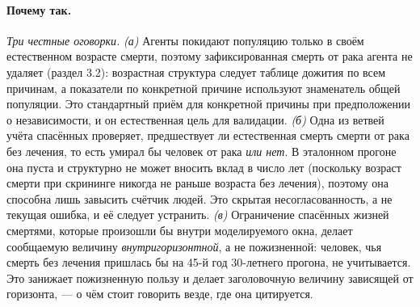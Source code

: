 \documentclass[12pt,a4paper]{article}
\newcommand{\why}[1]{\paragraph{Почему так.} #1}
\begin{document}
\why{\emph{Три честные оговорки.}
\emph{(а)} Агенты покидают популяцию только в своём естественном возрасте смерти, поэтому зафиксированная
смерть от рака агента не удаляет (раздел 3.2): возрастная структура следует таблице дожития по всем причинам,
а показатели по конкретной причине используют знаменатель общей популяции. Это стандартный приём для
конкретной причины при предположении о независимости, и он естественная цель для валидации.
\emph{(б)} Одна из ветвей учёта спасённых проверяет, предшествует ли естественная смерть смерти от рака без
лечения, то есть умирал бы человек от рака \emph{или нет}. В эталонном прогоне она пуста и структурно не
может вносить вклад в число лет (поскольку возраст смерти при скрининге никогда не раньше возраста без
лечения), поэтому она способна лишь завысить счётчик людей. Это скрытая несогласованность, а не текущая
ошибка, и её следует устранить.
\emph{(в)} Ограничение спасённых жизней смертями, которые произошли бы внутри моделируемого окна, делает
сообщаемую величину \emph{внутригоризонтной}, а не пожизненной: человек, чья смерть без лечения пришлась бы
на 45-й год 30-летнего прогона, не учитывается. Это занижает пожизненную пользу и делает заголовочную
величину зависящей от горизонта, --- о чём стоит говорить везде, где она цитируется.}
\end{document}
